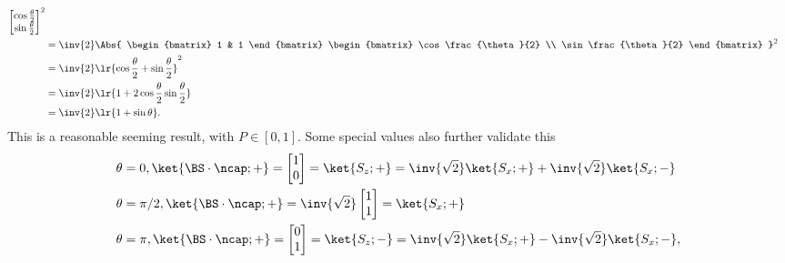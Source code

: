 {\begin{equation}
\begin{aligned}
{\begin{bmatrix}
\cos\frac{\theta}{2} \\
\sin\frac{\theta}{2}
\end{bmatrix}
}^2
\\ &=\inv{2}
\Abs{
\begin{bmatrix}
1 & 1
\end{bmatrix}
\begin{bmatrix}
\cos\frac{\theta}{2} \\
\sin\frac{\theta}{2}
\end{bmatrix}
}^2
\\ &=
\inv{2}
\lr{
\cos\frac{\theta}{2} +
\sin\frac{\theta}{2}
}^2
\\ &=
\inv{2}
\lr{ 1 + 2 \cos\frac{\theta}{2} \sin\frac{\theta}{2} }
\\ &=
\inv{2}
\lr{ 1 + \sin\theta }.
\end{aligned}
\end{equation}
%
This is a reasonable seeming result, with \( P \in [0, 1] \).  Some special values also further validate this
%
\begin{equation}\label{eqn:moreBraKetProblems:760}
\begin{aligned}
\theta &= 0, \ket{\BS \cdot \ncap ; + } =
\begin{bmatrix}
1 \\
0
\end{bmatrix}
=
\ket{S_z ; +}
=
\inv{\sqrt{2}} \ket{S_x;+}
+\inv{\sqrt{2}} \ket{S_x;-}
\\
\theta &= \pi/2, \ket{\BS \cdot \ncap ; + } =
\inv{\sqrt{2}}
\begin{bmatrix}
1 \\
1
\end{bmatrix}
=
\ket{S_x ; +}
\\
\theta &= \pi, \ket{\BS \cdot \ncap ; + } =
\begin{bmatrix}
0 \\
1
\end{bmatrix}
=
\ket{S_z ; -}
=
\inv{\sqrt{2}} \ket{S_x;+}
-\inv{\sqrt{2}} \ket{S_x;-},
\end{aligned}
\end{equation}

}
